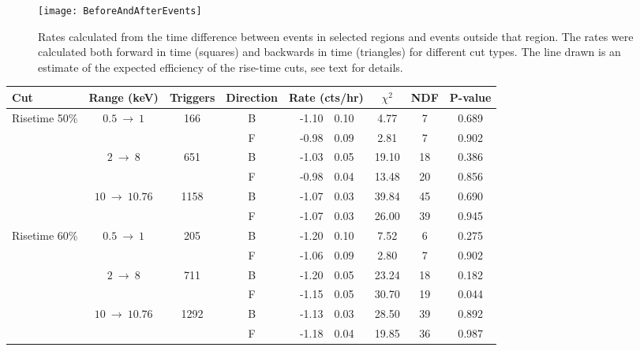 			\begin{figure}
				\centering
				\texttt{[image: BeforeAndAfterEvents]}
				\caption[Rates calculated from the time difference between events in selected regions]
				{Rates calculated from the time difference between events in selected regions and events outside that region.  The rates were calculated both forward
				in time (squares) and backwards in time (triangles) for different cut types.  The line drawn is an estimate of the expected efficiency of the rise-time cuts, 
				see text for details.}
				\label{fig:BeGeForBack}
			\end{figure}	
			
			\begin{table} \scriptsize
				\centering
				\renewcommand{\arraystretch}{0.75}
				\begin{tabular}{l  c  c  c  r@{$~\pm~$}l  c  c  c } 
				\toprule
					Cut & Range (keV) & Triggers & Direction & \multicolumn{2}{c}{Rate (cts/hr)} & $\chi^2$ & NDF & P-value  \\
				\midrule
				\multirow{6}{*}{Risetime 50\%}& \multirow{2}{*}{$0.5~\to~1$} & \multirow{2}{*}{166}	& B & -1.10 & 0.10 & 4.77 & 7 & 0.689\\
					& & & F & -0.98 & 0.09 & 2.81 & 7 & 0.902\\
				& \multirow{2}{*}{$2~\to~8$} & \multirow{2}{*}{651}	& B & -1.03 & 0.05 & 19.10 & 18 & 0.386\\
					& & & F & -0.98 & 0.04 & 13.48 & 20 & 0.856\\
				& \multirow{2}{*}{$10~\to~10.76$} & \multirow{2}{*}{1158}	& B & -1.07 & 0.03 & 39.84 & 45 & 0.690\\
					& & & F & -1.07 & 0.03 & 26.00 & 39 & 0.945\\
				\midrule
				
				\multirow{6}{*}{Risetime 60\%}& \multirow{2}{*}{$0.5~\to~1$} & \multirow{2}{*}{205}	& B & -1.20 & 0.10 & 7.52 & 6 & 0.275\\
					& & & F & -1.06 & 0.09 & 2.80 & 7 & 0.902\\
				& \multirow{2}{*}{$2~\to~8$} & \multirow{2}{*}{711}	& B & -1.20 & 0.05 & 23.24 & 18 & 0.182\\
					& & & F & -1.15 & 0.05 & 30.70 & 19 & 0.044\\
				& \multirow{2}{*}{$10~\to~10.76$} & \multirow{2}{*}{1292}	& B & -1.13 & 0.03 & 28.50 & 39 & 0.892\\
					& & & F & -1.18 & 0.04 & 19.85 & 36 & 0.987\\
				\midrule
				

\end{tabular}
\end{table}
